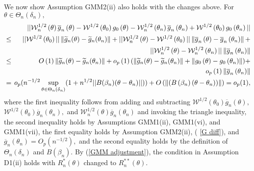 \documentclass[12pt,titlepage,final,oneside,letterpaper]{article}
\begin{document}
We now show Assumption GMM2(ii) also holds with the changes above. For $%
\theta \in \Theta _{n}(\delta _{n}),$%
\begin{eqnarray}
&&\hspace{-0.08in}||\mathcal{W}_{n}^{1/2}\left( \theta \right) \overline{g}%
_{n}\left( \theta \right) -\mathcal{W}^{1/2}\left( \theta _{0}\right)
g_{0}\left( \theta \right) -\mathcal{W}_{n}^{1/2}\left( \theta _{n}\right) 
\overline{g}_{n}\left( \theta _{n}\right) +\mathcal{W}^{1/2}\left( \theta
_{0}\right) g_{0}\left( \theta _{n}\right) ||  \notag \\
&\leq &\hspace{-0.08in}||\mathcal{W}^{1/2}\left( \theta _{0}\right)
||\left\Vert \widetilde{g}_{n}(\theta )-\widetilde{g}_{n}(\theta
_{n})\right\Vert +||\mathcal{W}_{n}^{1/2}\left( \theta \right) -\mathcal{W}%
^{1/2}\left( \theta _{0}\right) ||\left\Vert \overline{g}_{n}\left( \theta
\right) -\overline{g}_{n}\left( \theta _{n}\right) \right\Vert +  \notag \\
&&\hspace{-0.08in}||\mathcal{W}_{n}^{1/2}\left( \theta \right) -\mathcal{W}%
_{n}^{1/2}\left( \theta _{n}\right) ||\left\Vert \overline{g}_{n}\left(
\theta _{n}\right) \right\Vert  \notag \\
&\leq &\hspace{-0.08in}O\left( 1\right) \left\Vert \widetilde{g}_{n}(\theta
)-\widetilde{g}_{n}(\theta _{n})\right\Vert +o_{p}\left( 1\right)
(\left\Vert \widetilde{g}_{n}(\theta )-\widetilde{g}_{n}(\theta
_{n})\right\Vert +\left\Vert g_{0}\left( \theta \right) -g_{0}\left( \theta
_{n}\right) \right\Vert )+  \notag \\
&&\hspace{-0.08in}o_{p}\left( 1\right) \left\Vert \overline{g}_{n}\left(
\theta _{n}\right) \right\Vert  \label{GMM adjustment} \\
&=&\hspace{-0.08in}o_{p}(n^{-1/2}\sup_{\theta \in \Theta _{n}(\delta
_{n})}(1+n^{1/2}||B(\beta _{n})(\theta -\theta _{n})||))+O\left( \left\Vert
\left( B\left( \beta _{n}\right) \left( \theta -\theta _{n}\right) \right)
\right\Vert \right) =o_{p}(1),  \notag
\end{eqnarray}%
where the first inequality follows from adding and subtracting $\mathcal{W}%
^{1/2}\left( \theta _{0}\right) \overline{g}_{n}\left( \theta \right) ,$%
\linebreak $\mathcal{W}^{1/2}\left( \theta _{0}\right) \overline{g}%
_{n}\left( \theta _{n}\right) ,$ and $\mathcal{W}_{n}^{1/2}\left( \theta
\right) \overline{g}_{n}\left( \theta _{n}\right) $ and invoking the
triangle inequality, the second inequality holds by Assumptions GMM1(ii),
GMM1(vi), and GMM1(vii), the first equality holds by Assumption GMM2(ii), (%
\ref{G diff}), and $\overline{g}_{n}\left( \theta _{n}\right)
=O_{p}(n^{-1/2}),$ and the second equality holds by the definition of $%
\Theta _{n}(\delta _{n})$ and $B(\beta _{n})$. By (\ref{GMM adjustment}),
the condition in Assumption D1(ii) holds with $R_{n}^{\ast }(\theta )$
changed to $R_{n}^{\ast \ast }(\theta ).$
\end{document}

